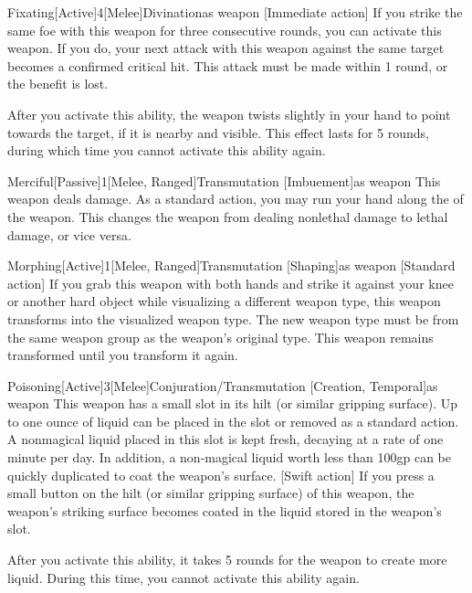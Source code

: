         \begin{magicitemdef}{Fixating}[Active]{4}[Melee]{Divination}{as weapon}
            [Immediate action] If you strike the same foe with this weapon for three consecutive rounds, you can activate this weapon.
            If you do, your next attack with this weapon against the same target becomes a confirmed critical hit.
            This attack must be made within 1 round, or the benefit is lost.

            After you activate this ability, the weapon twists slightly in your hand to point towards the target, if it is nearby and visible.
            This effect lasts for 5 rounds, during which time you cannot activate this ability again.
        \end{magicitemdef}

        \begin{magicitemdef}{Merciful}[Passive]{1}[Melee, Ranged]{Transmutation [Imbuement]}{as weapon}
             This weapon deals  damage.
            As a standard action, you may run your hand along the  of the weapon.
            This changes the weapon from dealing nonlethal damage to lethal damage, or vice versa.
        \end{magicitemdef}

        \begin{magicitemdef}{Morphing}[Active]{1}[Melee, Ranged]{Transmutation [Shaping]}{as weapon}
            [Standard action] If you grab this weapon with both hands and strike it against your knee or another hard object while visualizing a different weapon type, this weapon transforms into the visualized weapon type.
            The new weapon type must be from the same weapon group as the weapon's original type.
            This weapon remains transformed until you transform it again.
        \end{magicitemdef}

        \begin{magicitemdef}{Poisoning}[Active]{3}[Melee]{Conjuration/Transmutation [Creation, Temporal]}{as weapon}
             This weapon has a small slot in its hilt (or similar gripping surface). Up to one ounce of liquid can be placed in the slot or removed as a standard action. A nonmagical liquid placed in this slot is kept fresh, decaying at a rate of one minute per day. In addition, a non-magical liquid worth less than 100gp can be quickly duplicated to coat the weapon's surface.
            [Swift action] If you press a small button on the hilt (or similar gripping surface) of this weapon, the weapon's striking surface becomes coated in the liquid stored in the weapon's slot.

            After you activate this ability, it takes 5 rounds for the weapon to create more liquid.
            During this time, you cannot activate this ability again.
        \end{magicitemdef}

